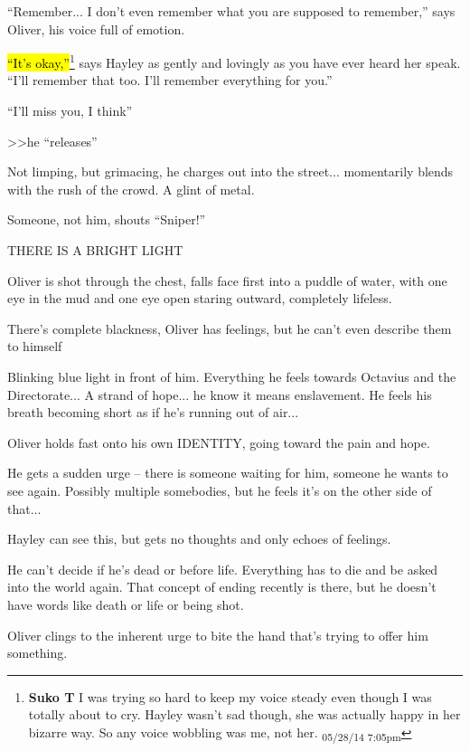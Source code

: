 ``Remember... I don't even remember what you are supposed to remember,'' says Oliver, his voice full of emotion.

\hl{``It's okay,''}\footnote{\textbf{Suko T }I was trying so hard to keep my voice steady even though I was totally about to cry.  Hayley wasn't sad though, she was actually happy in her bizarre way.  So any voice wobbling was me, not her. \textsubscript{05/28/14 7:05pm}} says Hayley as gently and lovingly as you have ever heard her speak.  ``I'll remember that too.  I'll remember everything for you.''

``I'll miss you, I think''



\textgreater \textgreater  he ``releases''

Not limping, but grimacing, he charges out into the street... momentarily blends with the rush of the crowd. A glint of metal. 

Someone, not him, shouts ``Sniper!''

THERE IS A BRIGHT LIGHT

Oliver is shot through the chest, falls face first into a puddle of water, with one eye in the mud and one eye open staring outward, completely lifeless.



There's complete blackness, Oliver has feelings, but he can't even describe them to himself

Blinking blue light in front of him.  Everything he feels towards Octavius and the Directorate... A strand of hope... he know it means enslavement. He feels his breath becoming short as if he's running out of air...

Oliver holds fast onto his own IDENTITY, going toward the pain and hope. 

He gets a sudden urge -- there is someone waiting for him, someone he wants to see again. Possibly multiple somebodies, but he feels it's on the other side of that...



Hayley can see this, but gets no thoughts and only echoes of feelings.



He can't decide if he's dead or before life. Everything has to die and be asked into the world again.  That concept of ending recently is there, but he doesn't have words like death or life or being shot.



Oliver clings to the inherent urge to bite the hand that's trying to offer him something. 



